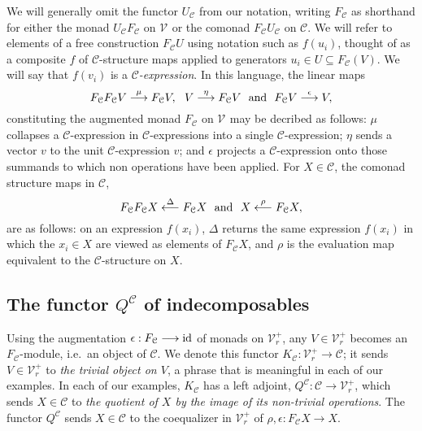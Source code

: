 \documentclass[11pt]{amsart}
\theoremstyle{plain}
\theoremstyle{definition}
\renewcommand{\to}{\longrightarrow}
\newcommand{\from}{\longleftarrow}
\newcommand{\calC}{\mathcal{C}}
\newcommand{\calV}{\mathcal{V}}
\newcommand{\calc}{\mathcal{C}}
\theoremstyle{plain}
\newcommand{\vect}[2]{\calV^{#1}_{#2}}
\newcommand{\Id}{\textup{id}}
\begin{document}
\begin{Conventions and notation}
We will generally omit the functor $U_{\calC}$ from our notation, writing $F_{\calC}$ as shorthand for either the monad $U_{\calC}F_{\calC}$ on $\vect{}{}$ or the comonad $F_{\calC}U_{\calC}$ on $\calC$. We will refer to elements of a free construction $F_\calC U$ using notation such as $f(u_i)$, thought of as a composite $f$ of $\calC$-structure maps applied to generators $u_i\in U\subseteq F_\calC(V)$. We will say that $f(v_i)$ is a \emph{$\calC$-expression}. In this language, the linear maps %
\[F_{\calc}F_{\calc}V\overset{\mu}{\to} F_{\calc}V,\ \ V\overset{\eta}{\to}F_{\calc}V\ \ \textup{and}\ \ F_{\calc}V\overset{\epsilon}{\to}V, \]
constituting the augmented monad $F_{\calc}$ on $\vect{}{}$ may be decribed as follows: $\mu$ collapses a $\calc$-expression  in $\calc$-expressions into a single $\calc$-expression; $\eta$ sends a vector $v$ to the unit $\calc$-expression $v$; and $\epsilon$ projects a $\calc$-expression onto those summands to which non operations have been applied.
For $X\in \calc$, the comonad structure maps in $\calc$,
\[F_{\calc}F_{\calc}X\overset{\Delta}{\from} F_{\calc}X\ \ \textup{and}\ \ X\overset{\rho}{\from}F_{\calc}X,\]
are as follows: on an expression $f(x_i)$, $\Delta$ returns the same expression $f(x_i)$ in which the $x_i\in X$ are viewed as elements of $F_{\calc}X$, and $\rho$ is the evaluation map equivalent to the $\calc$-structure on $X$.

\subsection{The functor $Q^\calc$ of indecomposables}
Using the augmentation $\epsilon:F_\calc\to\Id$ of monads on $\vect{+}{r}$, any $V\in\vect{+}{r}$ becomes an $F_{\calc}$-module, i.e.\ an object of $\calc$. We denote this functor $K_\calC:\vect{+}{r}\to \calC$; it sends $V\in\vect{+}{r}$ to \emph{the trivial object on $V$}, a phrase that is meaningful  in each of our examples. In each of our examples,  $K_{\calC}$ has a left adjoint, $Q^{\calC}:\calC\to\vect{+}{r}$, which sends $X\in\calC$ to \emph{the quotient of $X$ by the image of its non-trivial operations}. %
The functor $Q^{\calC}$ sends $X\in \calC$ to the coequalizer in $\vect{+}{r}$ of $\rho,\epsilon:F_{\calc}X\to X$.


\end{Conventions and notation}
\end{document}
